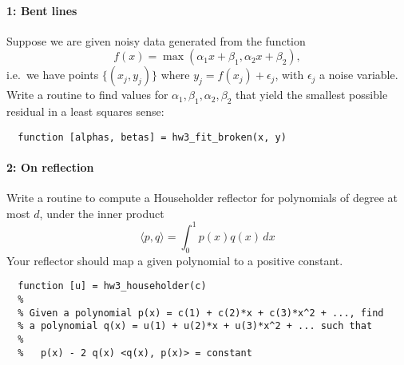 \documentclass[12pt, leqno]{article}
\begin{document}

\paragraph*{1: Bent lines}
Suppose we are given noisy data generated from the function
\[
  f(x) = \max(\alpha_1 x + \beta_1, \alpha_2 x + \beta_2),
\]
i.e.~we have points $\{ (x_j, y_j) \}$ where $y_j = f(x_j) + \epsilon_j$,
with $\epsilon_j$ a noise variable.  Write a routine to find values
for $\alpha_1, \beta_1, \alpha_2, \beta_2$ that yield the smallest possible
residual in a least squares sense:
\begin{lstlisting}
  function [alphas, betas] = hw3_fit_broken(x, y)
\end{lstlisting}

\paragraph*{2: On reflection}
Write a routine to compute a Householder reflector for polynomials of degree
at most $d$, under the inner product
\[
  \langle p, q \rangle = \int_0^1 p(x) q(x) \, dx
\]
Your reflector should map a given polynomial to a positive constant.
\begin{lstlisting}
  function [u] = hw3_householder(c)
  %
  % Given a polynomial p(x) = c(1) + c(2)*x + c(3)*x^2 + ..., find
  % a polynomial q(x) = u(1) + u(2)*x + u(3)*x^2 + ... such that
  %
  %   p(x) - 2 q(x) <q(x), p(x)> = constant
\end{lstlisting}
\end{document}

